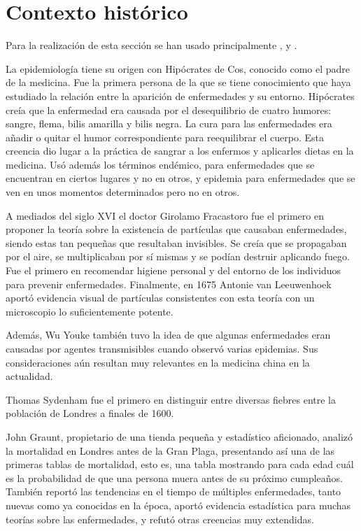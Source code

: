 \section*{Contexto histórico}

Para la realización de esta sección se han usado principalmente \cite{Byrne2012-ej}, \cite{Merril2010-nm} y \cite{Johnson2011-di}.

La epidemiología tiene su origen con Hipócrates de Cos, conocido como el padre de la medicina. Fue la primera persona de la que se tiene conocimiento que haya estudiado la relación entre la aparición de enfermedades y su entorno. Hipócrates creía que la enfermedad era causada por el desequilibrio de cuatro humores: sangre, flema, bilis amarilla y bilis negra. La cura para las enfermedades era añadir o quitar el humor correspondiente para reequilibrar el cuerpo. Esta creencia dio lugar a la práctica de sangrar a los enfermos y aplicarles dietas en la medicina. Usó además los términos endémico, para enfermedades que se encuentran en ciertos lugares y no en otros, y epidemia para enfermedades que se ven en unos momentos determinados pero no en otros.

A mediados del siglo XVI el doctor Girolamo Fracastoro fue el primero en proponer la teoría sobre la existencia de partículas que causaban enfermedades, siendo estas tan pequeñas que resultaban invisibles. Se creía que se propagaban por el aire, se multiplicaban por sí mismas y se podían destruir aplicando fuego. Fue el primero en recomendar higiene personal y del entorno de los individuos para prevenir enfermedades. Finalmente, en 1675 Antonie van Leeuwenhoek aportó evidencia visual de partículas consistentes con esta teoría con un microscopio lo suficientemente potente.

Además, Wu Youke también tuvo la idea de que algunas enfermedades eran causadas por agentes transmisibles cuando observó varias epidemias. Sus consideraciones aún resultan muy relevantes en la medicina china en la actualidad.

Thomas Sydenham fue el primero en distinguir entre diversas fiebres entre la población de Londres a finales de 1600.

John Graunt, propietario de una tienda pequeña y estadístico aficionado, analizó la mortalidad en Londres antes de la Gran Plaga, presentando así una de las primeras tablas de mortalidad, esto es, una tabla mostrando para cada edad cuál es la probabilidad de que una persona muera antes de su próximo cumpleaños. También reportó las tendencias en el tiempo de múltiples enfermedades, tanto nuevas como ya conocidas en la época, aportó evidencia estadística para muchas teorías sobre las enfermedades, y refutó otras creencias muy extendidas.

